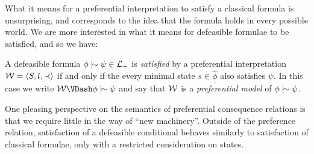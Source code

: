 What it means for a preferential interpretation to satisfy a classical formula is unsurprising, and corresponds to the idea
that the formula holds in every possible world. We are more interested in what it means for defeasible formulae to be
satisfied, and so we have:

\begin{definition}
	\label{definition:preferentially-satisfiable}

	A defeasible formula $\phi \twiddle \psi \in \Lang$ is \emph{satisfied} by a preferential interpretation $\mathcal{W} = \langle S,l,\prec \rangle$ if and
	only if the every minimal state $s \in \underline{\hat{\phi}}$ also satisfies $\psi$. In this case we write
	$\pin \VDash \phi \twiddle \psi$ and say that $\mathcal{W}$ is a \emph{preferential model} of $\phi \twiddle \psi$.
\end{definition}

One pleasing perspective on the semantics of preferential consequence relations is that we require little in the way of
``new machinery''. Outside of the preference relation, satisfaction of a defeasible conditional behaves similarly to
satisfaction of classical formulae, only with a restricted consideration on states.

